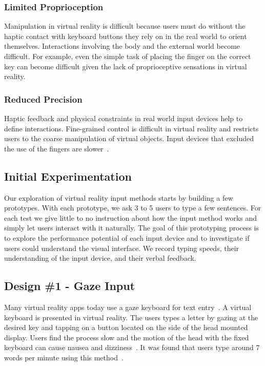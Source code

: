 \subsubsection{Limited Proprioception}
Manipulation in virtual reality is difficult because users must do without the haptic contact with keyboard buttons they rely on in the real world to orient themselves.
Interactions involving the body and the external world become difficult.
For example, even the simple task of placing the finger on the correct key can become difficult given the lack of proprioceptive sensations in virtual reality.

\subsubsection{Reduced Precision}
Haptic feedback and physical constraints in real world input devices help to define interactions. 
Fine-grained control is difficult in virtual reality and restricts users to the coarse manipulation of virtual objects.
Input devices that excluded the use of the fingers are slower~\cite{Zhai:1996:IMG:238386.238534}.  

\subsection{Initial Experimentation}

Our exploration of virtual reality input methods starts by building a few prototypes.
With each prototype, we ask 3 to 5 users to type a few sentences.  
For each test we give little to no instruction about how the input method works and simply let users interact with it naturally.
The goal of this prototyping process is to explore the performance potential of each input device and to investigate if users could understand the visual interface.
We record typing speeds, their understanding of the input device, and their verbal feedback.

\subsection{Design \#1 - Gaze Input}
Many virtual reality apps today use a gaze keyboard for text entry~\cite{netflix_app_for_oculus}.
A virtual keyboard is presented in virtual reality.
The users types a letter by gazing at the desired key and tapping on a button located on the side of the head mounted display.
Users find the process slow and the motion of the head with the fixed keyboard can cause nausea and dizziness~\cite{atienza2016interaction}.
It was found that users type around 7 words per minute using this method~\cite{majaranta2006effects}.

